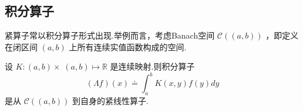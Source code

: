\vspace{-0.3 em}
\subsection{积分算子}

紧算子常以积分算子形式出现.举例而言，考虑Banach空间 $\mathcal{C}\left( \left(  {a,b}\right)  \right)$ ，即定义在闭区间 $\left(  {a,b}\right)$ 上所有连续实值函数构成的空间.
\vspace{1 em}
\begin{theorem}[积分算子的紧性]\label{thm:integral-operator-compact}
设 $K : \left(  {a,b}\right)   \times \; \left(  {a,b}\right)   \mapsto  \mathbb{R}$ 是连续映射.则积分算子
\begin{equation}\tag{4.8}\label{eq:integral-operator-def}
\left( {\Lambda f}\right) \left( x\right)  \doteq  {\int }_{a}^{b}K\left( {x,y}\right) f\left( y\right) {dy}
\end{equation}
是从 $\mathcal{C}\left( \left(  {a,b}\right)  \right)$ 到自身的紧线性算子.
\end{theorem}

